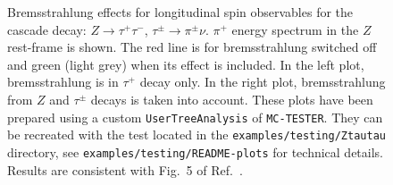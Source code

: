 \documentclass[]{Photos_interface_design}
\begin{document}
\begin{figure}[h!]
\centering
{}
\caption{ Bremsstrahlung effects for longitudinal spin observables
for the cascade decay: $Z \to \tau^+ \tau^-$, $\tau^\pm \to \pi^\pm\nu$.
$\pi^+$ energy spectrum in the $Z$ rest-frame  is shown. The red line is for 
bremsstrahlung switched off
and green (light grey) when its effect is included. 
In the left plot, bremsstrahlung is in $\tau^+ $ decay only.
In the right plot, bremsstrahlung from $Z$ and  $\tau^\pm$ decays is
taken into account.
These plots have been prepared using a custom {\tt UserTreeAnalysis} of {\tt MC-TESTER}.
They  can be recreated with the test located in the {\tt examples/testing/Ztautau} directory, see  {\tt examples/testing/README-plots} for technical details. Results are 
consistent with Fig.~5 of Ref.~\cite{Eberhard:1989ve}.
\label{fig:KKMC}
}
\end{figure}
\end{document}
